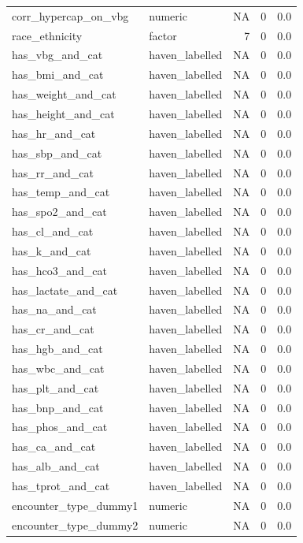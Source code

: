 \documentclass[
  11pt,
  letterpaper,
  DIV=11,
  numbers=noendperiod]{scrartcl}
\begin{document}
\begin{longtable*}{llrrr}
corr\_hypercap\_on\_vbg & numeric & NA & 0 & 0.0\\
\addlinespace
race\_ethnicity & factor & 7 & 0 & 0.0\\
has\_vbg\_and\_cat & haven\_labelled & NA & 0 & 0.0\\
has\_bmi\_and\_cat & haven\_labelled & NA & 0 & 0.0\\
has\_weight\_and\_cat & haven\_labelled & NA & 0 & 0.0\\
has\_height\_and\_cat & haven\_labelled & NA & 0 & 0.0\\
\addlinespace
has\_hr\_and\_cat & haven\_labelled & NA & 0 & 0.0\\
has\_sbp\_and\_cat & haven\_labelled & NA & 0 & 0.0\\
has\_rr\_and\_cat & haven\_labelled & NA & 0 & 0.0\\
has\_temp\_and\_cat & haven\_labelled & NA & 0 & 0.0\\
has\_spo2\_and\_cat & haven\_labelled & NA & 0 & 0.0\\
\addlinespace
has\_cl\_and\_cat & haven\_labelled & NA & 0 & 0.0\\
has\_k\_and\_cat & haven\_labelled & NA & 0 & 0.0\\
has\_hco3\_and\_cat & haven\_labelled & NA & 0 & 0.0\\
has\_lactate\_and\_cat & haven\_labelled & NA & 0 & 0.0\\
has\_na\_and\_cat & haven\_labelled & NA & 0 & 0.0\\
\addlinespace
has\_cr\_and\_cat & haven\_labelled & NA & 0 & 0.0\\
has\_hgb\_and\_cat & haven\_labelled & NA & 0 & 0.0\\
has\_wbc\_and\_cat & haven\_labelled & NA & 0 & 0.0\\
has\_plt\_and\_cat & haven\_labelled & NA & 0 & 0.0\\
has\_bnp\_and\_cat & haven\_labelled & NA & 0 & 0.0\\
\addlinespace
has\_phos\_and\_cat & haven\_labelled & NA & 0 & 0.0\\
has\_ca\_and\_cat & haven\_labelled & NA & 0 & 0.0\\
has\_alb\_and\_cat & haven\_labelled & NA & 0 & 0.0\\
has\_tprot\_and\_cat & haven\_labelled & NA & 0 & 0.0\\
encounter\_type\_dummy1 & numeric & NA & 0 & 0.0\\
\addlinespace
encounter\_type\_dummy2 & numeric & NA & 0 & 0.0\\

\end{longtable*}
\end{document}
